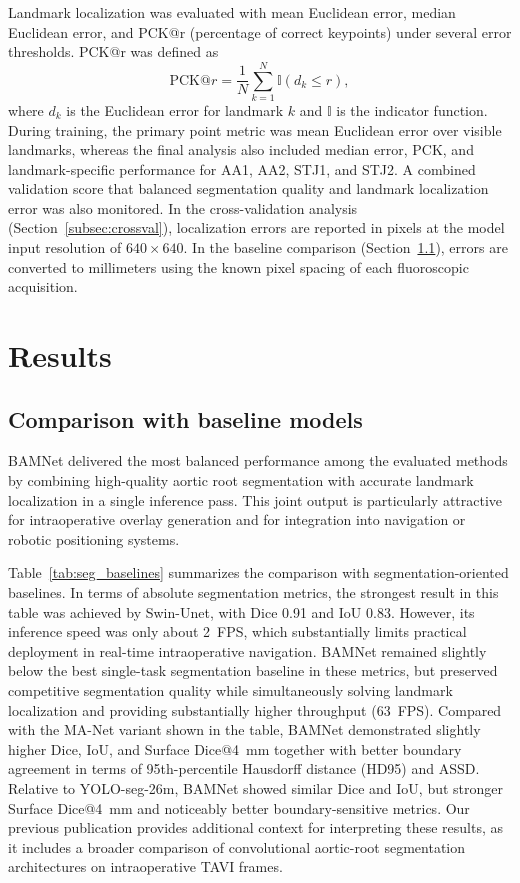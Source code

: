 \documentclass[oneside,pdflatex,sn-mathphys-num]{sn-jnl}
\begin{document}
Landmark localization was evaluated with mean Euclidean error, median Euclidean error, and PCK@r (percentage of correct keypoints) under several error thresholds. PCK@r was defined as
\begin{equation}
\mathrm{PCK}@r = \frac{1}{N}\sum_{k=1}^{N}\mathbb{I}(d_k \leq r),
\end{equation}
where $d_k$ is the Euclidean error for landmark $k$ and $\mathbb{I}$ is the indicator function. During training, the primary point metric was mean Euclidean error over visible landmarks, whereas the final analysis also included median error, PCK, and landmark-specific performance for AA1, AA2, STJ1, and STJ2. A combined validation score that balanced segmentation quality and landmark localization error was also monitored. In the cross-validation analysis (Section~\ref{subsec:crossval}), localization errors are reported in pixels at the model input resolution of $640 \times 640$. In the baseline comparison (Section~\ref{subsec:baseline_results}), errors are converted to millimeters using the known pixel spacing of each fluoroscopic acquisition.

\section{Results}\label{sec:results}

\subsection{Comparison with baseline models}\label{subsec:baseline_results}

BAMNet delivered the most balanced performance among the evaluated methods by combining high-quality aortic root segmentation with accurate landmark localization in a single inference pass. This joint output is particularly attractive for intraoperative overlay generation and for integration into navigation or robotic positioning systems.

Table~\ref{tab:seg_baselines} summarizes the comparison with segmentation-oriented baselines. In terms of absolute segmentation metrics, the strongest result in this table was achieved by Swin-Unet, with Dice 0.91 and IoU 0.83. However, its inference speed was only about 2~FPS, which substantially limits practical deployment in real-time intraoperative navigation. BAMNet remained slightly below the best single-task segmentation baseline in these metrics, but preserved competitive segmentation quality while simultaneously solving landmark localization and providing substantially higher throughput (63~FPS). Compared with the MA-Net variant shown in the table, BAMNet demonstrated slightly higher Dice, IoU, and Surface Dice@4~mm together with better boundary agreement in terms of 95th-percentile Hausdorff distance (HD95) and ASSD. Relative to YOLO-seg-26m, BAMNet showed similar Dice and IoU, but stronger Surface Dice@4~mm and noticeably better boundary-sensitive metrics. Our previous publication \cite{laptev2025_aorticroot} provides additional context for interpreting these results, as it includes a broader comparison of convolutional aortic-root segmentation architectures on intraoperative TAVI frames.
\end{document}
